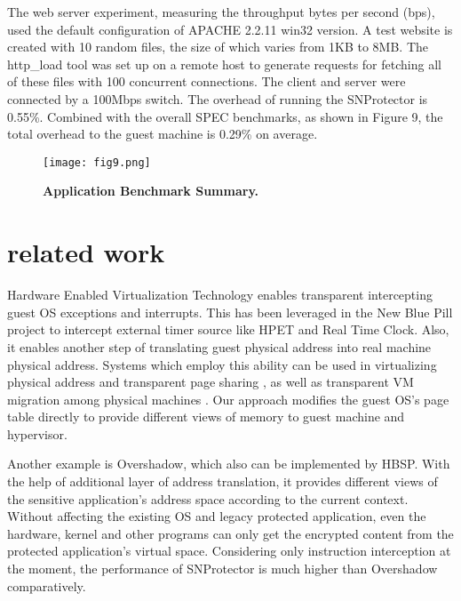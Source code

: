 \documentclass[conference]{IEEEtran}
\begin{document}
{The web server experiment, measuring the throughput bytes per
second (bps), used the default configuration of APACHE 2.2.11
win32 version. A test website is created with 10 random files, the
size of which varies from 1KB to 8MB. The http\_load tool was set
up on a remote host to generate requests for fetching all of these
files with 100 concurrent connections. The client and server were
connected by a 100Mbps switch. The overhead of running the
SNProtector is 0.55\%. Combined with the overall SPEC benchmarks,
as shown in Figure 9, the total overhead to the guest machine is
0.29\% on average.


\begin{figure}[!htb]
\centering
\texttt{[image: fig9.png]}
\caption{{\bf Application Benchmark Summary.}} \label{Figure 8.}
\end{figure}


\bigskip

\section{related work}
Hardware Enabled Virtualization Technology enables transparent
intercepting guest OS exceptions and interrupts. This has been
leveraged in the New Blue Pill project to intercept external timer
source like HPET and Real Time Clock\cite{IEEEhowto:8}. Also, it
enables another step of translating guest physical address into
real machine physical address. Systems which employ this ability
can be used in virtualizing physical address\cite{IEEEhowto:9} and
transparent page sharing\cite{IEEEhowto:10} , as well as
transparent VM migration among physical machines
\cite{IEEEhowto:11}. Our approach modifies the guest OS's page
table directly to provide different views of memory to guest
machine and hypervisor.

Another example is Overshadow\cite{IEEEhowto:6}, which also can be
implemented by HBSP. With the help of additional layer of address
translation, it provides different views of the sensitive
application's address space according to the current context.
Without affecting the existing OS and legacy protected
application, even the hardware, kernel and other programs can only
get the encrypted content from the protected application's virtual
space. Considering only instruction interception at the moment,
the performance of SNProtector is much higher than Overshadow
comparatively.

}
\end{document}
